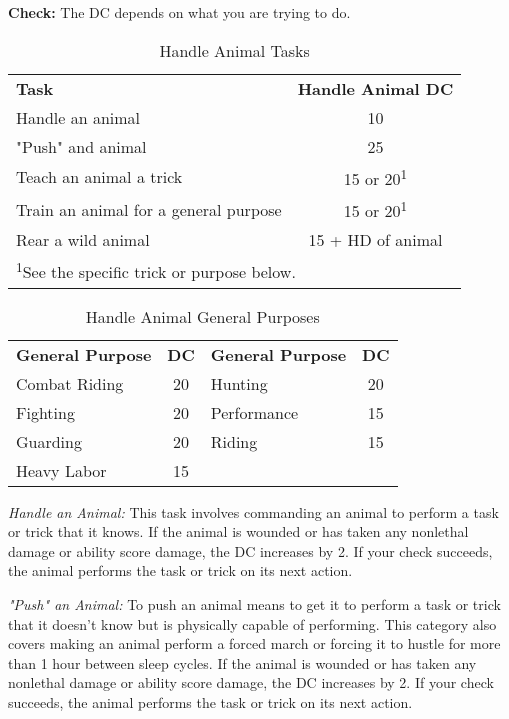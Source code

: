 
\textbf{Check:} The DC depends on what you are trying to do.

\begin{table}[htb]
\caption{Handle Animal Tasks}
\centering
\begin{tabular}{l c}
\textbf{Task} & \textbf{Handle Animal DC}\\
Handle an animal & 10\\
"Push" and animal & 25\\
Teach an animal a trick & 15 or 20\textsuperscript{1}\\
Train an animal for a general purpose & 15 or 20\textsuperscript{1}\\
Rear a wild animal & 15 + HD of animal\\
\multicolumn{2}{l}{\textsuperscript{1}See the specific trick or purpose below.}\\
\end{tabular}
\end{table}

\begin{table}[htb]
\caption{Handle Animal General Purposes}
\centering
\begin{tabular}{l c l c}
\textbf{General Purpose} & \textbf{DC} & \textbf{General Purpose} & \textbf{DC}\\
Combat Riding & 20 & Hunting & 20\\
Fighting & 20 & Performance & 15\\
Guarding & 20 & Riding & 15\\
Heavy Labor & 15 & &\\
\end{tabular}
\end{table}

\textit{Handle an Animal:} This task involves commanding an animal to perform a 
task or trick that it knows. If the animal is wounded or has taken any nonlethal 
damage or ability score damage, the DC increases by 2. If your check succeeds, 
the animal performs the task or trick on its next action.

\textit{"Push" an Animal:} To push an animal means to get it to perform a task 
or trick that it doesn't know but is physically capable of performing. This category 
also covers making an animal perform a forced march or forcing it to hustle for 
more than 1 hour between sleep cycles. If the animal is wounded or has taken any 
nonlethal damage or ability score damage, the DC increases by 2. If your check 
succeeds, the animal performs the task or trick on its next action.

